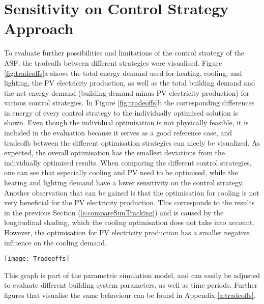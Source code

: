 \section{Sensitivity on Control Strategy Approach}
\label{s:tradeoffs}

	To evaluate further possibilities and limitations of the control strategy of the ASF, the tradeoffs between different strategies were visualised. Figure \ref{fig:tradeoffs}a shows the total energy demand used for heating, cooling, and lighting, the PV electricity production, as well as the total building demand and the net energy demand (building demand minus PV electricity production) for various control strategies. In Figure \ref{fig:tradeoffs}b the corresponding differences in energy of every control strategy to the individually optimised solution is shown. Even though the individual optimisation is not physically feasible, it is included in the evaluation because it serves as a good reference case, and tradeoffs between the different optimisation strategies can nicely be visualized. As expected, the overall optimisation has the smallest deviations from the individually optimised results. When comparing the different control strategies, one can see that especially cooling and PV need to be optimised, while the heating and lighting demand have a lower sensitivity on the control strategy. Another observation that can be gained is that the optimisation for cooling is not very beneficial for the PV electricity production. This corresponds to the results in the previous Section (\ref{s:compareSunTracking}) and is caused by the longitudinal shading, which the cooling optimisation does not take into account. However, the optimisation for PV electricity production has a smaller negative influence on the cooling demand. 

	\begin{figure*}[b!]
		\begin{center}
		\texttt{[image: Tradeoffs]}
		\caption{Comparison of different control strategies. (a) Total energy demand per room area. (b) Energy difference to individually optimised solution. While the individually optimised solution is not physically feasible, it is well suited for comparison and to emphasize the tradeoffs between the different optimisations.}
		\label{fig:tradeoffs}
		\end{center}
	\end{figure*}

	This graph is part of the parametric simulation model, and can easily be adjusted to evaluate different building system parameters, as well as time periods. Further figures that visualise the same behaviour can be found in Appendix \ref{a:tradeoffs}.





